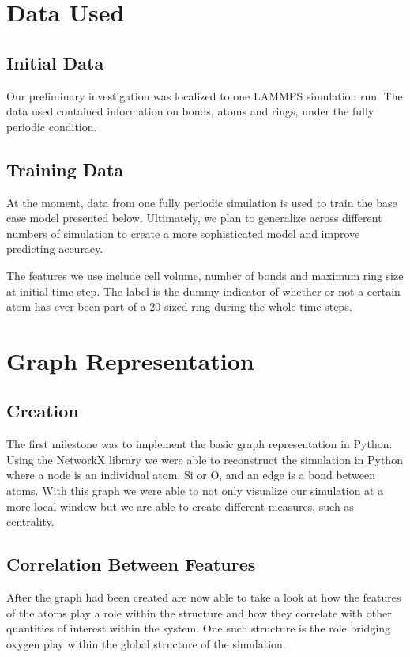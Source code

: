 \section{Data Used}
\subsection{Initial Data}

Our preliminary investigation was localized to one LAMMPS simulation run. The data used contained information on bonds, atoms and rings, under the fully periodic condition.

\subsection{Training Data}
At the moment, data from one fully periodic simulation is used to train the base case model presented below.  Ultimately, we plan to generalize across different numbers of simulation to create a more sophisticated model and improve predicting accuracy. 

The features we use include cell volume, number of bonds and maximum ring size at initial time step. The label is the dummy indicator of whether or not a certain atom has ever been part of a 20-sized ring during the whole time steps.

\section{Graph Representation}

\subsection{Creation}The first milestone was to implement the basic graph representation in Python. Using the NetworkX library we were able to reconstruct the simulation in Python where a node is an individual atom, Si or O, and an edge is a bond between atoms. With this graph we were able to not only visualize our simulation at a more local window but we are able to create different measures, such as centrality. 

\subsection{Correlation Between Features}
After the graph had been created are now able to take a look at how the features of the atoms play a role within the structure and how they correlate with other quantities of interest within the system. One such structure is the role bridging oxygen play within the global structure of the simulation. 


